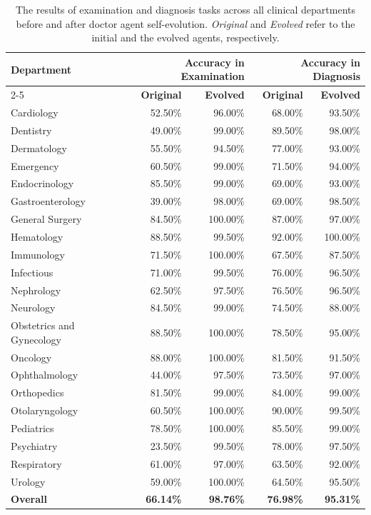 \documentclass[fleqn,12pt]{wlscirep}
\begin{document}
\begin{table}[htpb]
\centering
\caption{The results of examination and diagnosis tasks across all clinical departments before and after doctor agent self-evolution. \textit{Original} and \textit{Evolved} refer to the initial and the evolved agents, respectively.}
\label{tab: all department acc before and after evolution internal}
\begin{tabular}{lrrrr}
\hline
\multirow{2}{*}{\textbf{Department}} & \multicolumn{2}{r}{\textbf{Accuracy in Examination}} & \multicolumn{2}{r}{\textbf{Accuracy in Diagnosis}} \\ \cline{2-5} 
& \textbf{Original} & \textbf{Evolved} & \textbf{Original} & \textbf{Evolved}      \\ \hline
Cardiology       & 52.50\% & 96.00\%  & 68.00\% & 93.50\%  \\
Dentistry        & 49.00\% & 99.00\%  & 89.50\% & 98.00\%  \\
Dermatology      & 55.50\% & 94.50\%  & 77.00\% & 93.00\%  \\
Emergency        & 60.50\% & 99.00\%  & 71.50\% & 94.00\%  \\
Endocrinology    & 85.50\% & 99.00\%  & 69.00\% & 93.00\%  \\
Gastroenterology & 39.00\% & 98.00\%  & 69.00\% & 98.50\%  \\
General Surgery          & 84.50\% & 100.00\% & 87.00\% & 97.00\%  \\
Hematology       & 88.50\% & 99.50\%  & 92.00\% & 100.00\% \\
Immunology     & 71.50\% & 100.00\% & 67.50\% & 87.50\%  \\
Infectious       & 71.00\% & 99.50\%  & 76.00\% & 96.50\%  \\
Nephrology       & 62.50\% & 97.50\%  & 76.50\% & 96.50\%  \\
Neurology        & 84.50\% & 99.00\%  & 74.50\% & 88.00\%  \\
Obstetrics and Gynecology  & 88.50\%  & 100.00\% & 78.50\% & 95.00\% \\
Oncology         & 88.00\% & 100.00\% & 81.50\% & 91.50\%  \\
Ophthalmology    & 44.00\% & 97.50\%  & 73.50\% & 97.00\%  \\
Orthopedics      & 81.50\% & 99.00\%  & 84.00\% & 99.00\%  \\
Otolaryngology   & 60.50\% & 100.00\% & 90.00\% & 99.50\%  \\
Pediatrics       & 78.50\% & 100.00\% & 85.50\% & 99.00\%  \\
Psychiatry       & 23.50\% & 99.50\% & 78.00\% & 97.50\%  \\
Respiratory      & 61.00\% & 97.00\%  & 63.50\% & 92.00\%  \\
Urology          & 59.00\% & 100.00\% & 64.50\% & 95.50\%  \\ \hline
\textbf{Overall}  & \textbf{66.14\%}  & \textbf{98.76\%} & \textbf{76.98\%} & \textbf{95.31\%}  \\ \hline
\end{tabular}
\end{table}
\end{document}
